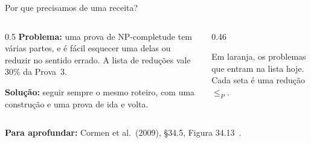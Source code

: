 \documentclass[aspectratio=169,xcolor=table]{beamer}
\newcommand{\fonte}[1]{%
  \vfill
  {\tiny\color{gray!55!black}\textbf{Para aprofundar:} #1\par}%
}
\newcommand{\prob}[1]{\textsc{#1}}
\begin{document}
\begin{frame}{Por que precisamos de uma receita?}
  \begin{columns}[T]
    \begin{column}{0.5\textwidth}
      \small
      \textbf{Problema:} uma prova de NP-completude tem várias partes, e é fácil esquecer uma
      delas ou reduzir no sentido errado. A lista de reduções vale 30\% da Prova~3.
      \medskip

      \textbf{Solução:} seguir sempre o mesmo roteiro, com uma construção e uma prova de
      ida e volta.
    \end{column}
    \begin{column}{0.46\textwidth}
      \begin{center}
      \end{center}
      {\scriptsize Em laranja, os problemas que entram na lista hoje. Cada seta é uma
      redução $\le_P$.\par}
    \end{column}
  \end{columns}
  \fonte{Cormen et al.\ (2009), \S 34.5, Figura 34.13~\cite{cormen2009introduction}.}
\end{frame}
\end{document}
